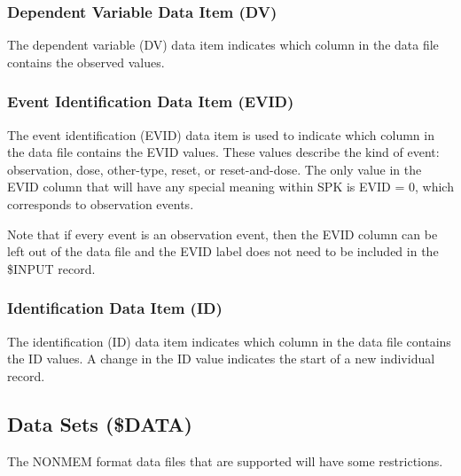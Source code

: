 \documentclass{article}
\begin{document}
\subsubsection{Dependent Variable Data Item (DV)}

The dependent variable (DV) data item indicates which column in 
the data file contains the observed values.


\subsubsection{Event Identification Data Item (EVID)}

The event identification (EVID) data item is used to indicate which
column in the data file contains the EVID values.
These values describe the kind of event: observation, dose, 
other-type, reset, or reset-and-dose.
The only value in the EVID column that will have any special meaning
within SPK is EVID = 0, which corresponds to observation events.

Note that if every event is an observation event, then
the EVID column can be left out of the data file and the EVID label
does not need to be included in the \$INPUT record.


\subsubsection{Identification Data Item (ID)}

The identification (ID) data item indicates which column in 
the data file contains the ID values.
A change in the ID value indicates the start of a new
individual record.


\subsection{Data Sets (\$DATA)}

The NONMEM format data files that are supported will have some 
restrictions.
\end{document}
